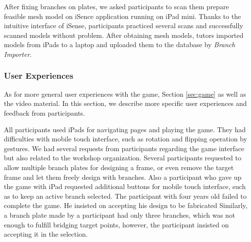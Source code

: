 After fixing branches on plates, we asked participants to scan them prepare feasible mesh model on iSence application running on iPad mini.
Thanks to the intuitive interface of iSense, participants practiced several scans and successfully scanned models without problem.
After obtaining mesh models, tutors imported models from iPads to a laptop and uploaded them to the database by \textit{Branch Importer}.



\subsubsection*{User Experiences}
As for more general user experiences with the game, Section \ref{sec:game} as well as the video material.
In this section, we describe more specific user experiences and feedback from participants.

All participants used iPads for navigating pages and playing the game.
They had difficulties with mobile touch interface, such as rotation and flipping operation by gestures.
We had several requests from participants regarding the game interface but also related to the workshop organization. Several participants requested to allow multiple branch plates for designing a frame, or even remove the target frame and let them freely design with branches.
Also a participant who gave up the game with iPad requested additional buttons for mobile touch interface, such as to keep an active branch selected.
The participant with four years old failed to complete the game.
He insisted on accepting his design to be fabricated 
Similarly, a branch plate made by a participant had only three branches, which was not enough to fulfill bridging target points, however, the participant insisted on accepting it in the selection.


